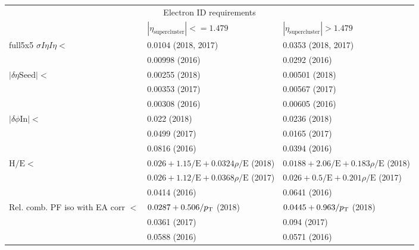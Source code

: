 \begin{table}
\noindent \centering{}
\label{e_tight_id}
\begin{tabular}{lll}
\hline
\multicolumn{3}{c}{Electron ID requirements}\\
                                 &  $|\eta_{\mathrm{supercluster}}| <= 1.479$ &  $|\eta_{\mathrm{supercluster}}| >1.479$ \\[2mm]
\hline 
\multirow{2}{*}{full5x5 $\sigma I \eta I\eta <$}     & 0.0104 (2018, 2017)                & 0.0353 (2018, 2017) \\
                                                     & 0.00998 (2016)                     & 0.0292 (2016) \\[2mm]
\multirow{3}{*}{$|\delta\eta \mathrm{Seed}| < $}     & 0.00255 (2018)                     & 0.00501 (2018) \\
                                                     & 0.00353 (2017)                     & 0.00567 (2017) \\
                                                     & 0.00308 (2016)                     & 0.00605 (2016) \\[2mm]
\multirow{3}{*}{$|\delta\phi \mathrm{In}| < $}       & 0.022 (2018)                       & 0.0236 (2018) \\
                                                     & 0.0499 (2017)                      & 0.0165 (2017) \\
                                                     & 0.0816 (2016)                      & 0.0394 (2016) \\[2mm]
\multirow{3}{*}{$\mathrm{H/E} <$}                    & $0.026+1.15/\mathrm{E}+0.0324\rho/\mathrm{E}$ (2018) & $0.0188+2.06/\mathrm{E}+0.183\rho/\mathrm{E}$ (2018) \\
& $0.026+1.12/\mathrm{E}+0.0368\rho/\mathrm{E}$ (2017) & $0.026+0.5/\mathrm{E}+0.201\rho/\mathrm{E}$ (2017) \\
& 0.0414 (2016) & 0.0641 (2016) \\[2mm]
\multirow{3}{*}{Rel. comb. PF iso with EA corr $<$}  & $0.0287+0.506/p_{\mathrm{T}}$ (2018)          & $0.0445+0.963/p_{\mathrm{T}}$ (2018) \\
                                                     & 0.0361 (2017)          & 0.094 (2017) \\
                                                     & 0.0588 (2016)          & 0.0571 (2016) \\[2mm]

\end{tabular}
\end{table}
